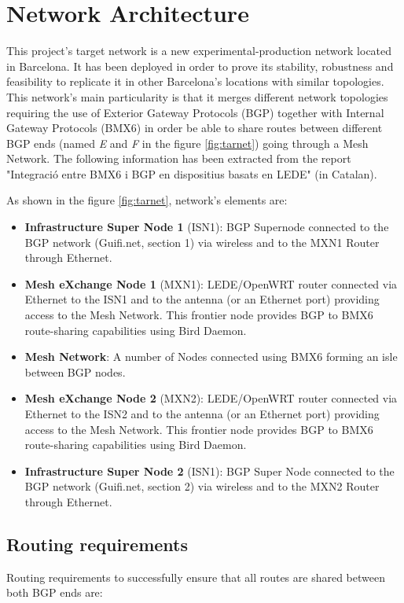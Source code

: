\chapter{Network Architecture}
\label{ch:architecture}

This project's target network is a new experimental-production network located in Barcelona. It has been deployed in order to prove its stability, robustness and feasibility to replicate it in other Barcelona's locations with similar topologies. This network's main particularity is that it merges different network topologies requiring the use of Exterior Gateway Protocols (BGP) together with Internal Gateway Protocols (BMX6) in order be able to share routes between different BGP ends (named \textit{E} and \textit{F} in the figure \ref{fig:tarnet}) going through a Mesh Network. The following information has been extracted from the report "Integració entre BMX6 i BGP en dispositius basats en LEDE" \cite{bgpbmx6} (in Catalan).

As shown in the figure \ref{fig:tarnet}, network's elements are:
\begin{itemize}
    \item \textbf{Infrastructure Super Node 1} (ISN1): BGP Supernode connected to the BGP network (Guifi.net, section 1) via wireless and to the MXN1 Router through Ethernet.     
    \item \textbf{Mesh eXchange Node 1} (MXN1): LEDE/OpenWRT router connected via Ethernet to the ISN1 and to the antenna (or an Ethernet port) providing access to the Mesh Network. This frontier node provides BGP to BMX6 route-sharing capabilities using Bird Daemon.
    \item \textbf{Mesh Network}: A number of Nodes connected using BMX6 forming an isle between BGP nodes.
    \item \textbf{Mesh eXchange Node 2} (MXN2): LEDE/OpenWRT router connected via Ethernet to the ISN2 and to the antenna (or an Ethernet port) providing access to the Mesh Network. This frontier node provides BGP to BMX6 route-sharing capabilities using Bird Daemon.
    \item \textbf{Infrastructure Super Node 2} (ISN1): BGP Super Node connected to the BGP network (Guifi.net, section 2) via wireless and to the MXN2 Router through Ethernet.
\end{itemize}


\section{Routing requirements}
Routing requirements to successfully ensure that all routes are shared between both BGP ends are:

